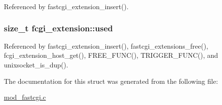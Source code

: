 Referenced by fastcgi\-\_\-extension\-\_\-insert().

\hypertarget{structfcgi__extension_a3c0e38fb6c0db1a484b5a50a61a9d58b}{
\subsubsection[{used}]{\setlength{\rightskip}{0pt plus 5cm}size\-\_\-t fcgi\-\_\-extension\-::used}}\label{structfcgi__extension_a3c0e38fb6c0db1a484b5a50a61a9d58b}


Referenced by fastcgi\-\_\-extension\-\_\-insert(), fastcgi\-\_\-extensions\-\_\-free(), fcgi\-\_\-extension\-\_\-host\-\_\-get(), F\-R\-E\-E\-\_\-\-F\-U\-N\-C(), T\-R\-I\-G\-G\-E\-R\-\_\-\-F\-U\-N\-C(), and unixsocket\-\_\-is\-\_\-dup().



The documentation for this struct was generated from the following file\-:\begin{DoxyCompactItemize}
\item 
\hyperlink{mod__fastcgi_8c}{mod\-\_\-fastcgi.\-c}\end{DoxyCompactItemize}
